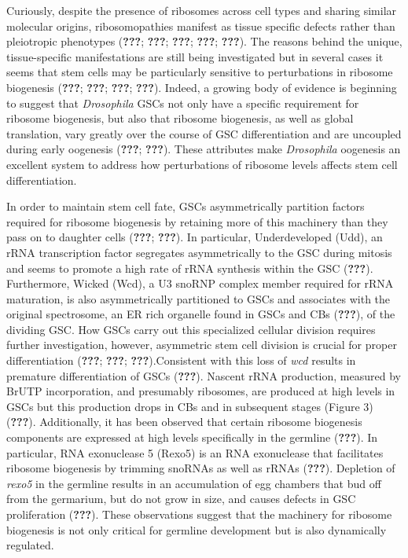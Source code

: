 \documentclass[12pt,oneside]{reedthesis}
\begin{document}
Curiously, despite the presence of ribosomes across cell types and
sharing similar molecular origins, ribosomopathies manifest as tissue
specific defects rather than pleiotropic phenotypes ({\textbf{???}}; {\textbf{???}}; {\textbf{???}}; {\textbf{???}}; {\textbf{???}}).
The reasons behind the unique, tissue-specific manifestations are still
being investigated but in several cases it seems that stem cells may be
particularly sensitive to perturbations in ribosome biogenesis
({\textbf{???}}; {\textbf{???}}; {\textbf{???}}; {\textbf{???}}). Indeed, a growing body of evidence is beginning
to suggest that \emph{Drosophila} GSCs not only have a specific requirement
for ribosome biogenesis, but also that ribosome biogenesis, as well as
global translation, vary greatly over the course of GSC differentiation
and are uncoupled during early oogenesis ({\textbf{???}}; {\textbf{???}}). These attributes make \emph{Drosophila} oogenesis an
excellent system to address how perturbations of ribosome levels affects
stem cell differentiation.

In order to maintain stem cell fate, GSCs asymmetrically partition
factors required for ribosome biogenesis by retaining more of this
machinery than they pass on to daughter cells ({\textbf{???}}; {\textbf{???}}). In particular, Underdeveloped (Udd), an rRNA
transcription factor segregates asymmetrically to the GSC during mitosis
and seems to promote a high rate of rRNA synthesis within the GSC
({\textbf{???}}). Furthermore, Wicked (Wcd), a U3 snoRNP complex member
required for rRNA maturation, is also asymmetrically partitioned to GSCs
and associates with the original spectrosome, an ER rich organelle found
in GSCs and CBs ({\textbf{???}}), of the dividing GSC. How GSCs
carry out this specialized cellular division requires further
investigation, however, asymmetric stem cell division is crucial for
proper differentiation ({\textbf{???}}; {\textbf{???}}; {\textbf{???}}).Consistent with this loss of \emph{wcd} results in premature
differentiation of GSCs ({\textbf{???}}). Nascent rRNA production,
measured by BrUTP incorporation, and presumably ribosomes, are produced
at high levels in GSCs but this production drops in CBs and in
subsequent stages (Figure 3) ({\textbf{???}}). Additionally, it has been
observed that certain ribosome biogenesis components are expressed at
high levels specifically in the germline ({\textbf{???}}). In particular,
RNA exonuclease 5 (Rexo5) is an RNA exonuclease that facilitates
ribosome biogenesis by trimming snoRNAs as well as rRNAs
({\textbf{???}}). Depletion of \emph{rexo5} in the germline results in
an accumulation of egg chambers that bud off from the germarium, but do
not grow in size, and causes defects in GSC proliferation
({\textbf{???}}). These observations suggest that the machinery for
ribosome biogenesis is not only critical for germline development but is
also dynamically regulated.
\end{document}
